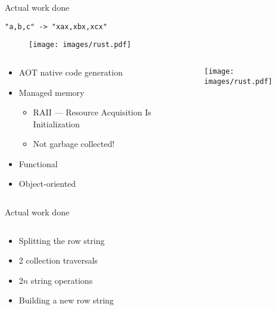 \documentclass[aspectratio=169]{beamer}
\newcommand{\megatext}[1]{
  \begin{center}
    \Huge
    #1
  \end{center}
}
\begin{document}
\begin{frame}{Actual work done}
  \megatext{\texttt{"a,b,c" -> "xax,xbx,xcx"}}
\end{frame}


\begin{frame}
  \begin{figure}
    \texttt{[image: images/rust.pdf]}
  \end{figure}
\end{frame}


\begin{frame}
  \begin{columns}[c]
    \begin{column}{0.5\textwidth}
      \begin{itemize}
      \item AOT native code generation
      \item Managed memory
        \begin{itemize}
          \item RAII --- Resource Acquisition Is Initialization
          \item Not garbage collected!
        \end{itemize}
      \item Functional
      \item Object-oriented
      \end{itemize}
    \end{column}

    \begin{column}{0.5\textwidth}
      \begin{figure}
        \texttt{[image: images/rust.pdf]}
      \end{figure}
    \end{column}
  \end{columns}
\end{frame}


\begin{frame}[fragile]{Actual work done}
  \inputminted{rust}{snippets/handle_line.rs}

  \begin{itemize}
    \item Splitting the row string
    \item 2 collection traversals
    \item $2n$ string operations
    \item Building a new row string
  \end{itemize}
\end{frame}
\end{document}
